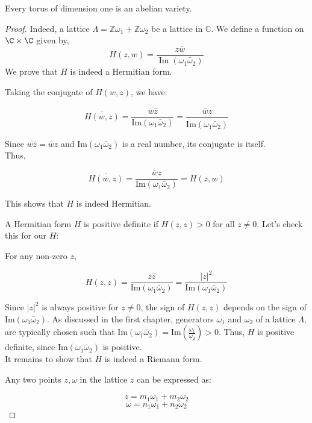 \begin{remark}
\begin{theorem}
    \end{theorem}

\begin{corollary}
    Every torus of  dimension one is an abelian variety. 
\end{corollary}
\begin{proof}

Indeed, a lattice $\Lambda= \mathbb{Z} \omega_{1}+\mathbb{Z} \omega_{2}$ be a lattice in $\mathbb{C}$. 
We define a function on $\C \times \C$ given by,
$$
H(z, w)=\frac{z \bar{w}}{\operatorname{Im}\left(\omega_{1} \bar{\omega}_{2}\right)}
$$ 
We prove that $H$ is indeed a Hermitian form.

Taking the conjugate of \( H(w, z) \), we have:

\[ \overline{H(w, z)} = \overline{\frac{w \bar{z}}{\text{Im}(\omega_1 \bar{\omega}_2)}} = \frac{\bar{w} z}{\overline{\text{Im}(\omega_1 \bar{\omega}_2)}} \]

Since $\overline{w\bar{z}}=\bar{w}z$ and \( \text{Im}(\omega_1 \bar{\omega}_2) \) is a real number, its conjugate is itself.\\
Thus,

\[ \overline{H(w, z)} = \frac{\bar{w} z}{\text{Im}(\omega_1 \bar{\omega}_2)} = H(z, w) \]

This shows that \( H \) is indeed Hermitian.


A Hermitian form \( H \) is positive definite if \( H(z, z) > 0 \) for all \( z \neq 0 \). Let's check this for our \( H \):

For any non-zero \( z \),

\[ H(z, z) = \frac{z \bar{z}}{\text{Im}(\omega_1 \bar{\omega}_2)} = \frac{|z|^2}{\text{Im}(\omega_1 \bar{\omega}_2)} \]

Since \( |z|^2 \) is always positive for \( z \neq 0 \), the sign of \( H(z, z) \) depends on the sign of \( \text{Im}(\omega_1 \bar{\omega}_2) \). 
As discussed in the first chapter, generators \( \omega_1 \) and \( \omega_2 \) of a lattice $\Lambda$, are typically chosen such that \( \text{Im}(\omega_1 \bar{\omega}_2)=\text{Im}(\frac{\omega_1}{\omega_2}) > 0 \). 
Thus,  \( H \) is positive definite, since \( \text{Im}(\omega_1 \bar{\omega}_2) \) is positive. \\


It remains to show that $H$ is indeed a Riemann form. 


Any two points \( z, \omega \) in the lattice \( z \) can be expressed as:

\[ z = m_1 \omega_1 + m_2 \omega_2 \]
\[ \omega = n_1 \omega_1 + n_2 \omega_2 \]


\end{proof}
\end{remark}
